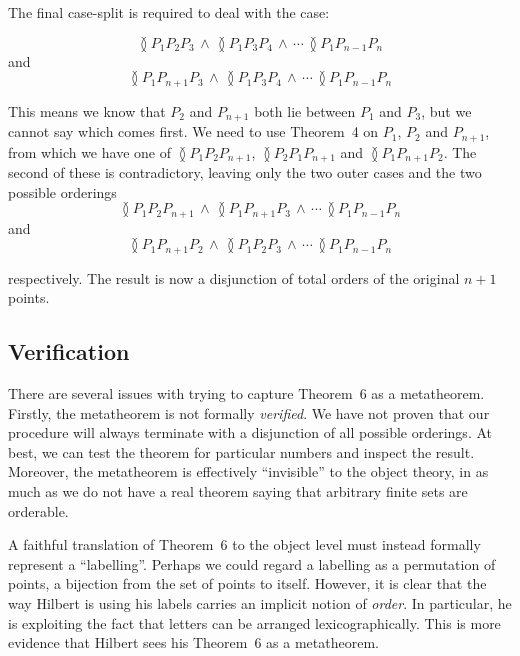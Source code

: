 The final case-split is required to deal with the case:

\begin{displaymath}
\between{P_1}{P_2}{P_3}\,\wedge\,\between{P_1}{P_3}{P_4}\,\wedge\,\cdots\,\between{P_1}{P_{n-1}}{P_n}
\end{displaymath}
and
\begin{displaymath}
\between{P_1}{P_{n+1}}{P_3}\,\wedge\,\between{P_1}{P_3}{P_4}\,\wedge\,\cdots\,\between{P_1}{P_{n-1}}{P_n}
\end{displaymath}

This means we know that $P_2$ and $P_{n+1}$ both lie between $P_1$ and $P_3$, but we cannot say which comes first. We need to use Theorem~4 on $P_1$, $P_2$ and $P_{n+1}$, from which we have one of $\between{P_1}{P_2}{P_{n+1}}$, $\between{P_2}{P_1}{P_{n+1}}$ and $\between{P_1}{P_{n+1}}{P_2}$. The second of these is contradictory, leaving only the two outer cases and the two possible orderings
\begin{displaymath}
\between{P_1}{P_2}{P_{n+1}} \,\wedge\,\between{P_1}{P_{n+1}}{P_3}\,\wedge\,\cdots\,\between{P_1}{P_{n-1}}{P_n}
\end{displaymath}
and
\begin{displaymath}
\between{P_1}{P_{n+1}}{P_2}\,\wedge\,\between{P_1}{P_2}{P_3}\,\wedge\,\cdots\,\between{P_1}{P_{n-1}}{P_n}
\end{displaymath}

respectively. The result is now a disjunction of total orders of the original $n+1$ points.

\subsection{Verification}
There are several issues with trying to capture Theorem~6 as a metatheorem. Firstly, the metatheorem is not formally \emph{verified}. We have not proven that our procedure will always terminate with a disjunction of all possible orderings. At best, we can test the theorem for particular numbers and inspect the result. Moreover, the metatheorem is effectively ``invisible'' to the object theory, in as much as we do not have a real theorem saying that arbitrary finite sets are orderable. 

A faithful translation of Theorem~6 to the object level must instead formally represent a ``labelling''. Perhaps we could regard a labelling as a permutation of points, a bijection from the set of points to itself. However, it is clear that the way Hilbert is using his labels carries an implicit notion of \emph{order}. In particular, he is exploiting the fact that letters can be arranged lexicographically. This is more evidence that Hilbert sees his Theorem~6 as a metatheorem.

